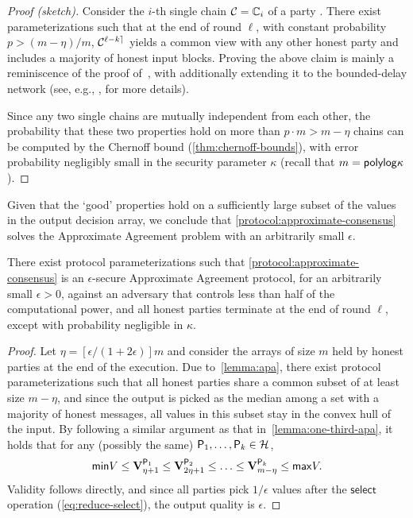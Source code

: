 \begin{proof}[Proof (sketch)]
    Consider the $i$-th single chain $\mathcal{C} = \mathbb{C}_i$ of a party \party.
    There exist parameterizations such that at the end of round $\ell$, with constant probability $p > (m - \eta) / m$, $\mathcal{C}^{{\ell - k}\rceil}$ yields a common view with any other honest party and includes a majority of honest input blocks.
    Proving the above claim is mainly a reminiscence of the proof of~\cite[Theorem 2]{EC:GarKiaShe24}, with additionally extending it to the bounded-delay network (see, e.g., \cite[Section 7]{EPRINT:GarKiaLeo14}, for more details).

    Since any two single chains are mutually independent from each other, the probability that these two %
    properties hold on more than $p \cdot m  > m - \eta$ chains can be computed by the Chernoff bound (\cref{thm:chernoff-bounds}), with error probability negligibly small in the security parameter $\kappa$ (recall that $m = \mathsf{polylog} \kappa$).
\end{proof}

Given that the `good' properties hold on a sufficiently large subset of the values in the output decision array, we conclude that \cref{protocol:approximate-consensus} solves the Approximate Agreement problem with an arbitrarily small $\epsilon$.

\begin{theorem} \label{thm:honest-majority-approx-agreement}
    There exist protocol parameterizations such that \cref{protocol:approximate-consensus} is an $\epsilon$-secure Approximate Agreement protocol, for an arbitrarily small $\epsilon > 0$, against an adversary that controls less than half of the computational power, and all honest parties terminate at the end of round $\ell$, except with probability negligible in $\kappa$.
\end{theorem}

\begin{proof}
    Let $\eta = [\epsilon/(1 + 2\epsilon)]m$ and consider the arrays of size $m$ held by honest parties at the end of the execution.
    Due to~\cref{lemma:apa}, there exist protocol parameterizations such that all honest parties share a common subset of at least size $m - \eta$, and since the output is picked as the median among a set with a majority of honest messages, all values in this subset stay in the convex hull of the input.
    By following a similar argument as that in~\cref{lemma:one-third-apa}, it holds that for any (possibly the same) $\mathsf{P}_1, \ldots, \mathsf{P}_k \in \mathcal{H}$,
    \[ \mathsf{min} V \le \mathbf{V}^{\mathsf{P}_1}_{\eta + 1} \le \mathbf{V}^{\mathsf{P}_2}_{2\eta + 1} \le \ldots \le  \mathbf{V}^{\mathsf{P}_k}_{m - \eta} \le \mathsf{max} V. \]
    Validity follows directly, and since all parties pick $1/\epsilon$ values after the $\mathsf{select}$ operation (\cref{eq:reduce-select}), the output quality is $\epsilon$.
\end{proof}

